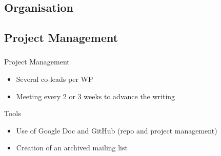 \subsection{Organisation}

\subsection{Project Management}
\begin{frame}
  \frametitle{\insertsectionhead}
  \framesubtitle{\insertsubsectionhead}
  \begin{alertblock}{Project Management}
    \begin{itemize}
      \item Several co-leads per WP 
      \item Meeting every 2 or 3 weeks to advance the writing

    \end{itemize}
  \end{alertblock}

\begin{alertblock}{Tools}
  \begin{itemize}
    \item  Use of Google Doc and GitHub (repo and project management)
    \item Creation  of an archived mailing list 
  \end{itemize}
\end{alertblock}
\end{frame}


